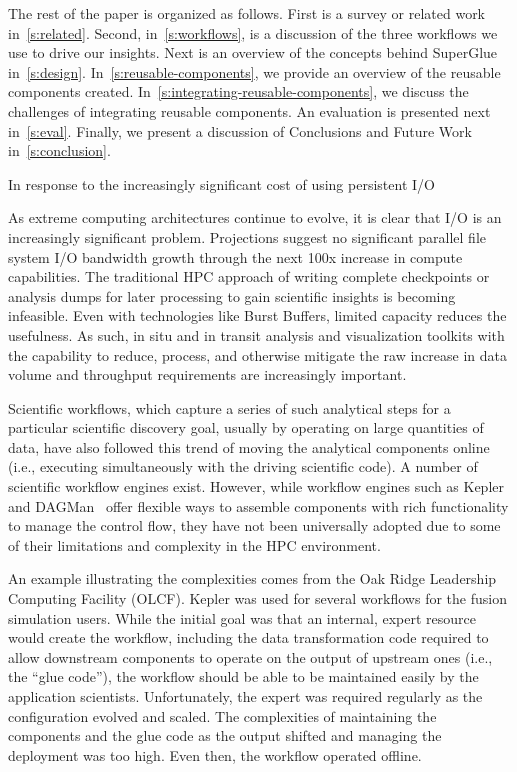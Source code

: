 The rest of the paper is organized as follows. First is a survey or related
work in~\autoref{s:related}. Second, in~\autoref{s:workflows}, is a
discussion of the three workflows we use to drive our insights. Next is an
overview of the concepts behind SuperGlue in~\autoref{s:design}.
In~\autoref{s:reusable-components}, we provide an overview of the reusable
components created. In~\autoref{s:integrating-reusable-components}, we
discuss the challenges of integrating reusable components.  An evaluation is
presented next in~\autoref{s:eval}. Finally, we present a discussion of Conclusions
and Future Work in~\autoref{s:conclusion}.


In response to the increasingly significant cost of using
persistent I/O 

As extreme computing architectures continue to evolve, it is 
clear that I/O is an increasingly significant problem.  Projections suggest no
significant parallel file system I/O bandwidth growth through the next 100x
increase in compute capabilities.  The traditional HPC approach of writing
complete checkpoints or analysis dumps for later processing to gain scientific
insights is becoming infeasible.  Even with technologies like Burst Buffers,
limited capacity reduces the usefulness. As such, in situ and in transit
analysis and visualization toolkits with the capability to reduce, process, and
otherwise mitigate the raw increase in data volume and throughput requirements
are increasingly important.


Scientific workflows, which 
capture a series of such analytical steps for a
particular scientific discovery goal, usually
by operating on large quantities of data,
have also followed this trend of moving the analytical components
online (i.e., executing simultaneously with the driving scientific code).
A number of scientific workflow engines exist.
However, while workflow engines such as
Kepler~\cite{bertram:2006:kepler} and
DAGMan~\cite{Malewicz:2006:dagman}
offer flexible ways to assemble components
with rich functionality to manage the control flow, they have not been
universally adopted due to some of their limitations and complexity in the
HPC environment.

An example illustrating the complexities comes from the Oak Ridge
Leadership Computing Facility (OLCF).  Kepler was used for several workflows
for the fusion simulation users.  While the initial goal was that an internal,
expert resource would create the workflow,
including the data transformation code required
to allow downstream components to operate on the output of
upstream ones (i.e., the ``glue code''),
the workflow should be able to be maintained
easily by the application scientists. Unfortunately,
the expert was required regularly as the configuration evolved and scaled.
The complexities of maintaining the components and the glue code as the output
shifted and managing the deployment was too high.
Even then, the workflow operated offline.

